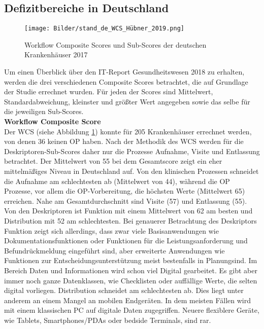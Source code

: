\subsection{Defizitbereiche in Deutschland}
\label{sec:defizit_deutschland}
\begin{figure}[ht]
	\centering
 	\texttt{[image: Bilder/stand\_de\_WCS\_Hübner\_2019.png]}
	\caption{Workflow Composite Scores und Sub-Scores der deutschen Krankenhäuser 2017 \parencite[39]{huebner2019}}
	\label{fig:stand_de_WCS}
\end{figure}
Um einen Überblick über den IT-Report Gesundheitswesen 2018 zu erhalten, werden die drei verschiedenen Composite Scores betrachtet, die auf Grundlage der Studie errechnet wurden. Für jeden der Scores sind Mittelwert, Standardabweichung, kleinster und größter Wert angegeben sowie das selbe für die jeweiligen Sub-Scores.
\vspace{\parheadvspace}\\
\textbf{Workflow Composite Score}\\
Der WCS (siehe Abbildung \ref{fig:stand_de_WCS}) konnte für 205 Krankenhäuser errechnet werden, von denen 36 keinen OP haben. Nach der Methodik des WCS werden für die Deskriptoren-Sub-Scores daher nur die Prozesse Aufnahme, Visite und Entlassung betrachtet. Der Mittelwert von 55 bei dem Gesamtscore zeigt ein eher mittelmäßiges Niveau in Deutschland auf. Von den klinischen Prozessen schneidet die Aufnahme am schlechtesten ab (Mittelwert von 44), während die OP Prozesse, vor allem die OP-Vorbereitung, die höchsten Werte (Mittelwert 65) erreichen. Nahe am Gesamtdurchschnitt sind Visite (57) und Entlassung (55). Von den Deskriptoren ist Funktion mit einem Mittelwert von 62 am besten und Distribution mit 52 am schlechtesten. Bei genauerer Betrachtung des Deskriptors Funktion zeigt sich allerdings, dass zwar viele Basisanwendungen wie Dokumentationsfunktionen oder Funktionen für die Leistungsanforderung und Befundrückmeldung eingeführt sind, aber erweiterte Anwendungen wie Funktionen zur Entscheidungsunterstützung meist bestenfalls \glqq in Planung\grqq{ }sind. Im Bereich Daten und Informationen wird schon viel Digital gearbeitet. Es gibt aber immer noch ganze Datenklassen, wie Checklisten oder auffällige Werte, die selten digital vorliegen. Distribution schneidet am schlechtesten ab. Dies liegt unter anderem an einem Mangel an mobilen Endgeräten. In dem meisten Fällen wird mit einem klassischen PC auf digitale Daten zugegriffen. Neuere flexiblere Geräte, wie Tablets, Smartphones/PDAs oder bedside Terminals, sind rar. \parencite{huebner2019}
